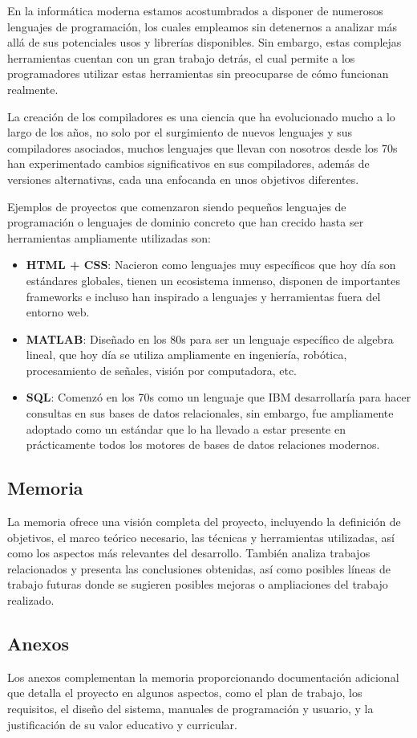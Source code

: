 En la informática moderna estamos acostumbrados a disponer de numerosos lenguajes de programación, los cuales empleamos sin detenernos a analizar más allá de sus potenciales usos y librerías disponibles. Sin embargo, estas complejas herramientas cuentan con un gran trabajo detrás, el cual permite a los programadores utilizar estas herramientas sin preocuparse de cómo funcionan realmente.

La creación de los compiladores es una ciencia que ha evolucionado mucho a lo largo de los años, no solo por el surgimiento de nuevos lenguajes y sus compiladores asociados, muchos lenguajes que llevan con nosotros desde los 70s han experimentado cambios significativos en sus compiladores, además de versiones alternativas, cada una enfocanda en unos objetivos diferentes.

Ejemplos de proyectos que comenzaron siendo pequeños lenguajes de programación o lenguajes de dominio concreto que han crecido hasta ser herramientas ampliamente utilizadas son: 
\begin{itemize}
    \item \textbf{HTML + CSS}: Nacieron como lenguajes muy específicos que hoy día son estándares globales, tienen un ecosistema inmenso, disponen de importantes frameworks e incluso han inspirado a lenguajes y herramientas fuera del entorno web.
    \item \textbf{MATLAB}: Diseñado en los 80s para ser un lenguaje específico de algebra lineal, que hoy día se utiliza ampliamente en ingeniería, robótica, procesamiento de señales, visión por computadora, etc.  
    \item \textbf{SQL}: Comenzó en los 70s como un lenguaje que IBM desarrollaría para hacer consultas en sus bases de datos relacionales, sin embargo, fue ampliamente adoptado como un estándar que lo ha llevado a estar presente en prácticamente todos los motores de bases de datos relaciones modernos. 
\end{itemize}

\subsection{Memoria}
La memoria ofrece una visión completa del proyecto, incluyendo la definición de objetivos, el marco teórico necesario, las técnicas y herramientas utilizadas, así como los aspectos más relevantes del desarrollo. También analiza trabajos relacionados y presenta las conclusiones obtenidas, así como posibles líneas de trabajo futuras donde se sugieren posibles mejoras o ampliaciones del trabajo realizado.

\subsection{Anexos}
Los anexos complementan la memoria proporcionando documentación adicional que detalla el proyecto en algunos aspectos, como el plan de trabajo, los requisitos, el diseño del sistema, manuales de programación y usuario, y la justificación de su valor educativo y curricular.